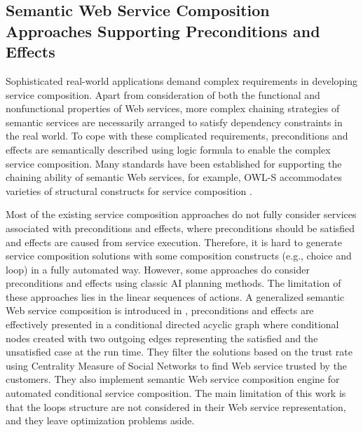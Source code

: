 \subsection{Semantic Web Service Composition Approaches Supporting Preconditions and Effects}\label{Semantic}
Sophisticated real-world applications demand complex requirements in developing service composition. Apart from consideration of both the functional and nonfunctional properties of Web services, more complex chaining strategies of semantic services are necessarily arranged to satisfy dependency constraints in the real world. To cope with these complicated requirements, preconditions and effects are semantically described using logic formula to enable the complex service composition. Many standards have been established for supporting the chaining ability of semantic Web services, for example, OWL-S accommodates varieties of structural constructs for service composition \cite{wang2014automated}.

Most of the existing service composition approaches do not fully consider services associated with preconditions and effects, where preconditions should be satisfied and effects are caused from service execution. Therefore, it is hard to generate service composition solutions with some composition constructs (e.g., choice and loop) in a fully automated way. However, some approaches do consider preconditions and effects using classic AI planning methods. The limitation of these approaches lies in the linear sequences of actions. A generalized semantic Web service composition is introduced in \cite{bansal2016generalized}, preconditions and effects are effectively presented in a conditional directed acyclic graph where conditional nodes created with two outgoing edges representing the satisfied and the unsatisfied case at the run time. They filter the solutions based on the trust rate using Centrality Measure of Social Networks to find Web service trusted by the customers. They also implement semantic Web service composition engine for automated conditional service composition. The main limitation of this work is that the loops structure are not considered in their Web service representation, and they leave optimization problems aside.

